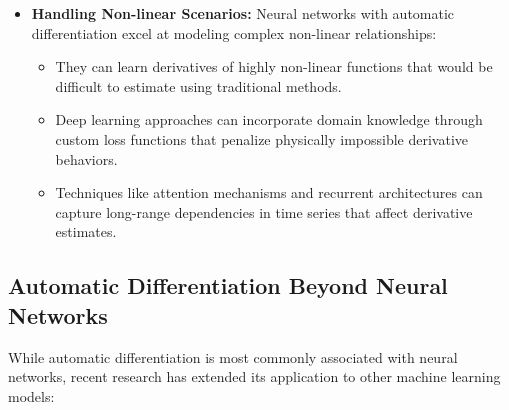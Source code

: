 \documentclass{article}
\begin{document}
\begin{itemize}
    \item \textbf{Handling Non-linear Scenarios:} Neural networks with automatic differentiation excel at modeling complex non-linear relationships:
    \begin{itemize}
        \item They can learn derivatives of highly non-linear functions that would be difficult to estimate using traditional methods.
        \item Deep learning approaches can incorporate domain knowledge through custom loss functions that penalize physically impossible derivative behaviors.
        \item Techniques like attention mechanisms and recurrent architectures can capture long-range dependencies in time series that affect derivative estimates.
    \end{itemize}
\end{itemize}

\subsection{Automatic Differentiation Beyond Neural Networks}

While automatic differentiation is most commonly associated with neural networks, recent research has extended its application to other machine learning models:
\end{document}
